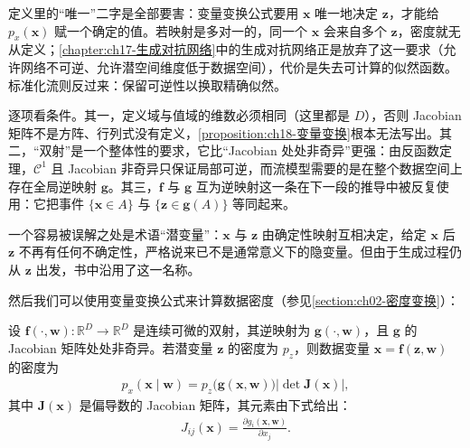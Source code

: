 \documentclass[../main.tex]{subfiles}
\begin{document}
\begin{remark}
定义里的“唯一”二字是全部要害：变量变换公式要用 $\bm{x}$ 唯一地决定 $\bm{z}$，才能给 $p_x(\bm{x})$ 赋一个确定的值。若映射是多对一的，同一个 $\bm{x}$ 会来自多个 $\bm{z}$，密度就无从定义；\cref{chapter:ch17-生成对抗网络}中的生成对抗网络正是放弃了这一要求（允许网络不可逆、允许潜空间维度低于数据空间），代价是失去可计算的似然函数。标准化流则反过来：保留可逆性以换取精确似然。

逐项看条件。其一，定义域与值域的维数必须相同（这里都是 $D$），否则 Jacobian 矩阵不是方阵、行列式没有定义，\cref{proposition:ch18-变量变换}根本无法写出。其二，“双射”是一个整体性的要求，它比“Jacobian 处处非奇异”更强：由反函数定理，$\mathcal{C}^{1}$ 且 Jacobian 非奇异只保证局部可逆，而流模型需要的是在整个数据空间上存在全局逆映射 $\bm{g}$。其三，$\bm{f}$ 与 $\bm{g}$ 互为逆映射这一条在下一段的推导中被反复使用：它把事件 $\{\bm{x}\in A\}$ 与 $\{\bm{z}\in\bm{g}(A)\}$ 等同起来。

一个容易被误解之处是术语“潜变量”：$\bm{x}$ 与 $\bm{z}$ 由确定性映射互相决定，给定 $\bm{x}$ 后 $\bm{z}$ 不再有任何不确定性，严格说来已不是通常意义下的隐变量。但由于生成过程仍从 $\bm{z}$ 出发，书中沿用了这一名称。
\end{remark}

然后我们可以使用变量变换公式来计算数据密度（参见\cref{section:ch02-密度变换}）：

\begin{proposition}[变量变换公式]\label{proposition:ch18-变量变换}
设 $\bm{f}(\cdot,\bm{w}):\mathbb{R}^{D}\rightarrow\mathbb{R}^{D}$ 是连续可微的双射，其逆映射为 $\bm{g}(\cdot,\bm{w})$，且 $\bm{g}$ 的 Jacobian 矩阵处处非奇异。若潜变量 $\bm{z}$ 的密度为 $p_z$，则数据变量 $\bm{x}=\bm{f}(\bm{z},\bm{w})$ 的密度为
\begin{align}
  p_x(\bm{x}\mid\bm{w})=p_z\big(\bm{g}(\bm{x},\bm{w})\big)\left|\det\bm{J}(\bm{x})\right|,
  \label{align:ch18-change-var}
\end{align}
其中 $\bm{J}(\bm{x})$ 是偏导数的 Jacobian 矩阵，其元素由下式给出：
\begin{align}
  J_{ij}(\bm{x})=\frac{\partial g_i(\bm{x},\bm{w})}{\partial x_j}.
  \label{align:ch18-Jacobian元素}
\end{align}
\end{proposition}
\end{document}
